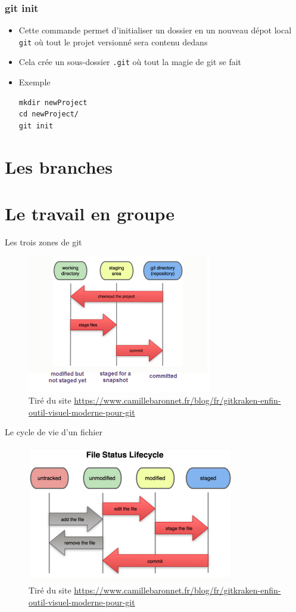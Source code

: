 \documentclass{beamer}
\begin{document}
\begin{frame}[fragile]
\frametitle{git init}

\begin{itemize}
\item Cette commande permet d'initialiser un dossier en un nouveau dépot local \texttt{git} où tout le projet versionné sera contenu dedans

\item Cela crée un sous-dossier \texttt{.git} où tout la magie de git se fait
\item Exemple
\begin{lstlisting}
mkdir newProject
cd newProject/
git init
\end{lstlisting}
\end{itemize}
\end{frame}

  \section{Les branches}
  \section{Le travail en groupe}
\begin{frame}{Les trois zones de git}
\begin{figure}
    \centering
    \includegraphics[height=6cm]{img/git-local-operations.png}
    \caption{Tiré du site \url{https://www.camillebaronnet.fr/blog/fr/gitkraken-enfin-outil-visuel-moderne-pour-git}}
\end{figure}
\end{frame}

\begin{frame}{Le cycle de vie d'un fichier}
\begin{figure}
    \centering
    \includegraphics[height=6cm]{img/git-filestatuslifecycle.png}
    \caption{Tiré du site \url{https://www.camillebaronnet.fr/blog/fr/gitkraken-enfin-outil-visuel-moderne-pour-git}}
\end{figure}
\end{frame}
\end{document}
